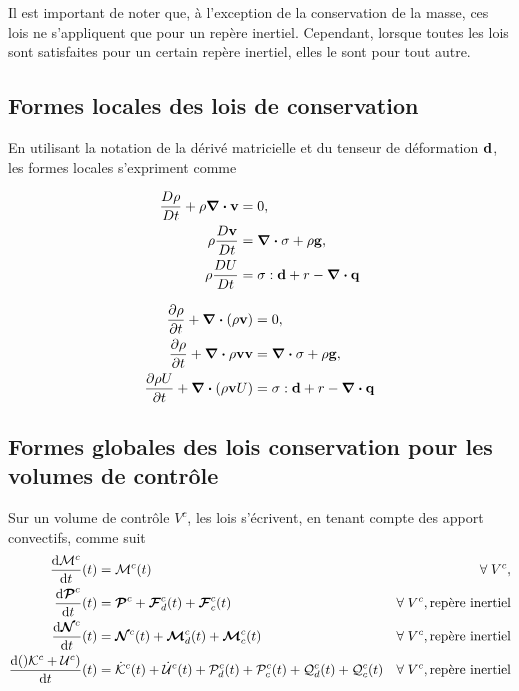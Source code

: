 \documentclass[a4paper,11pt]{report}
\newcommand{\dvm}[2]{\frac{D #1}{D #2}}
\begin{document}
      Il est important de noter que, à l'exception de la conservation de la masse, ces lois ne s'appliquent que pour un repère inertiel. Cependant, lorsque toutes les lois sont satisfaites pour un certain repère inertiel, elles le sont pour tout autre.

    \subsection{Formes locales des lois de conservation}
      En utilisant la notation de la dérivé matricielle et du tenseur de déformation $\vb{d}$, les formes locales s'expriment comme
      \begin{multicols}{2}
        \begin{align}
          \dvm{\rho}{t} + \rho \div \vb{v} &= 0, \nonumber\\
          \rho \dvm{\vb{v}}{t} &= \div \sigma + \rho \vb{g},\nonumber\\
          \rho \dvm{U}{t} &= \vb{\sigma} : \vb{d} + r - \div \vb{q} \nonumber
        \end{align}

        \begin{align}
          \pdv{\rho}{t} + \div (\rho \vb{v}) &= 0, \nonumber \\
          \pdv{\rho}{t} + \div {\rho \vb{v} \vb{v}} &= \div \vb{\sigma} + \rho \vb{g}, \\
          \pdv{\rho U}{t} + \div (\rho \vb{v} U) &= \vb{\sigma} : \vb{d} + r - \div \vb{q} \nonumber
        \end{align}

      \end{multicols}

    \subsection{Formes globales des lois conservation pour les volumes de contrôle}
      Sur un volume de contrôle $V^c$, les lois s'écrivent, en tenant compte des apport convectifs, comme suit
      \begin{gather}\begin{aligned}
        \dv{\mathcal{M}^c}{t} {} (t) &= \mathcal{M}^c(t) & \forall \; V^c, \\
        \dv{\boldsymbol{\mathcal{P}}^c}{t} {} (t) &= \boldsymbol{\mathcal{P}}^c + \boldsymbol{\mathcal{F}}^c_d(t) + \boldsymbol{\mathcal{F}}^c_c(t) & \forall \; V^c, \textrm{repère inertiel} \\
        \dv{\boldsymbol{\mathcal{N}}^c}{t} {} (t) &= \boldsymbol{\mathcal{N}}^c(t) + \boldsymbol{\mathcal{M}}^c_d(t) + \boldsymbol{\mathcal{M}}^c_c(t) & \forall \; V^c, \textrm{repère inertiel} \\
        \dv{()\mathcal{K}^c + \mathcal{U}^c)}{t} {}(t) &= \dot{\mathcal{K}}^c (t) + \dot{\mathcal{U}}^c(t) + \mathcal{P}^c_d(t) + \mathcal{P}^c_c(t) + \mathcal{Q}^c_d (t) + \mathcal{Q}^c_c (t) &  \forall \; V^c, \textrm{repère inertiel}
      \end{aligned}\end{gather}
\end{document}
